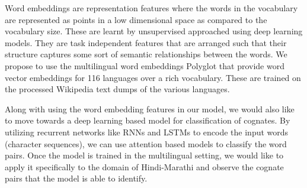\documentclass[journal]{IEEEtran}
\begin{document}
Word embeddings are representation features where the words in the vocabulary are represented as points in a low dimensional space as compared to the vocabulary size. These are learnt by unsupervised approached using deep learning models. They are task independent features that are arranged such that their structure captures some sort of semantic relationships between the words. We propose to use the multilingual word embeddings Polyglot \cite{polyglot:2013:ACL-CoNLL} that provide word vector embeddings for 116 languages over a rich vocabulary. These are trained on the processed Wikipedia text dumps of the various languages. 

Along with using the word embedding features in our model, we would also like to move towards a deep learning based model for classification of cognates. By utilizing recurrent networks like RNNs and LSTMs to encode the input words (character sequences), we can use attention based models to classify the word pairs. Once the model is trained in the multilingual setting, we would like to apply it specifically to the domain of Hindi-Marathi and observe the cognate pairs that the model is able to identify. 



\end{document}
